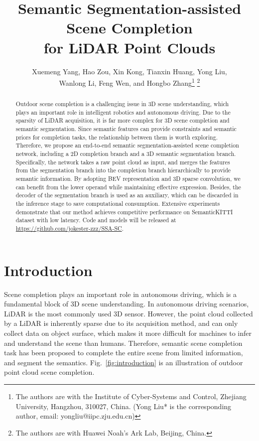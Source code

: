 \documentclass[letterpaper, 10 pt, conference]{ieeeconf}
\title{\LARGE \bf
Semantic Segmentation-assisted Scene Completion \\
for LiDAR Point Clouds
}
\author{Xuemeng Yang, Hao Zou, Xin Kong, Tianxin Huang, Yong Liu, \\
Wanlong Li, Feng Wen, and Hongbo Zhang\thanks{The authors are with the Institute of Cyber-Systems and Control, Zhejiang University, Hangzhou, 310027, China. (Yong Liu* is the corresponding author, email: yongliu@iipc.zju.edu.cn)}
\thanks{The authors are with Huawei Noah’s Ark Lab, Beijing, China.}
}
\begin{document}
\maketitle
\thispagestyle{empty}
\pagestyle{empty}


\begin{abstract}

	Outdoor scene completion is a challenging issue in 3D scene understanding, which plays an important role in intelligent robotics and autonomous driving. Due to the sparsity of LiDAR acquisition, it is far more complex for 3D scene completion and semantic segmentation. Since semantic features can provide constraints and semantic priors for completion tasks, the relationship between them is worth exploring. Therefore, we propose an end-to-end semantic segmentation-assisted scene completion network, including a 2D completion branch and a 3D semantic segmentation branch. Specifically, the network takes a raw point cloud as input, and merges the features from the segmentation branch into the completion branch hierarchically to provide semantic information. By adopting BEV representation and 3D sparse convolution, we can benefit from the lower operand while maintaining effective expression. Besides, the decoder of the segmentation branch is used as an auxiliary, which can be discarded in the inference stage to save computational consumption. Extensive experiments demonstrate that our method achieves competitive performance on SemanticKITTI dataset with low latency. Code and models will be released at \href{https://github.com/jokester-zzz/SSA-SC}{https://github.com/jokester-zzz/SSA-SC}.

\end{abstract}


\section{Introduction}

Scene completion plays an important role in autonomous driving, which is a fundamental block of 3D scene understanding. In autonomous driving scenarios, LiDAR is the most commonly used 3D sensor. However, the point cloud collected by a LiDAR is inherently sparse due to its acquisition method, and can only collect data on object surface, which makes it more difficult for machines to infer and understand the scene than humans. Therefore, semantic scene completion task has been proposed to complete the entire scene from limited information, and segment the semantics. Fig.~\ref{fig:introduction} is an illustration of outdoor point cloud scene completion. 
\end{document}
